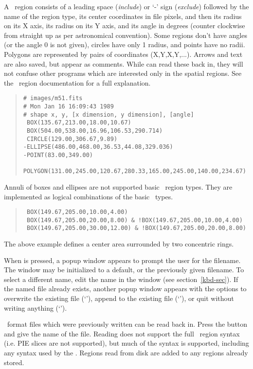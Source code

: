 A \PROS\ region consists of a leading space ({\em include}) or `-' sign ({\em exclude})
followed by the name of the region type, its center coordinates in file
pixels, and then its radius on its X axis, its radius on its Y axis, and
its angle in degrees (counter clockwise from straight up as per
astronomical convention).  Some regions don't have angles (or the angle 0
is not given), circles have only 1 radius, and points have no radii.
Polygons are represented by pairs of coordinates (X,Y,X,Y,...).  Arrows and
text are also saved, but appear as comments.  While {\SAO} can read these
back in, they will not confuse other programs which are interested only in
the spatial regions.  See the \PROS\ region documentation for a full
explanation.

\begin{quote}
\begin{verbatim}
# images/m51.fits
# Mon Jan 16 16:09:43 1989
# shape x, y, [x dimension, y dimension], [angle]
 BOX(135.67,213.00,18.00,10.67)
 BOX(504.00,538.00,16.96,106.53,290.714)
 CIRCLE(129.00,306.67,9.89)
-ELLIPSE(486.00,468.00,36.53,44.08,329.036)
-POINT(83.00,349.00)
 POLYGON(131.00,245.00,120.67,280.33,165.00,245.00,140.00,234.67)
\end{verbatim}
\end{quote}

Annuli of boxes and ellipses are not supported basic \PROS\ region types.
They are implemented as logical combinations of the basic \PROS\ types.
\begin{quote}
\begin{verbatim}
 BOX(149.67,205.00,10.00,4.00)
 BOX(149.67,205.00,20.00,8.00) & !BOX(149.67,205.00,10.00,4.00)
 BOX(149.67,205.00,30.00,12.00) & !BOX(149.67,205.00,20.00,8.00)
\end{verbatim}
\end{quote}
The above example defines a center area surrounded by two concentric rings.

When  is pressed, a popup window appears to prompt the user for
the filename.  The window may be initialized to a default, or the
previously given filename.  To select a different name, edit the
name in the window (see section~\ref{kbd-sec}).  If the named file
already exists, another popup window appears with the options to overwrite the
existing file (`'), append to the existing file (`'), or quit without
writing anything (`').

\PROS\ format files which were previously written can be read back in.
Press the  button and give the name of the file.  Reading does
not support the full \PROS\ region syntax (i.e. {\sf PIE} slices are not
supported), but much of the syntax is supported, including any syntax
used by the .  Regions read from disk are added to any regions
already stored.

